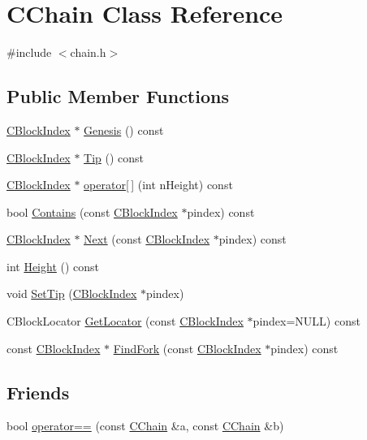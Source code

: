 \hypertarget{class_c_chain}{}\section{C\+Chain Class Reference}
\label{class_c_chain}


{\ttfamily \#include $<$chain.\+h$>$}

\subsection*{Public Member Functions}
\begin{DoxyCompactItemize}
\item 
\hyperlink{class_c_block_index}{C\+Block\+Index} $\ast$ \hyperlink{class_c_chain_a1eee0372da596a8fc68369e480adc2f1}{Genesis} () const 
\item 
\hyperlink{class_c_block_index}{C\+Block\+Index} $\ast$ \hyperlink{class_c_chain_a7482d06d8e8143f46326cf9c12c06daf}{Tip} () const 
\item 
\hyperlink{class_c_block_index}{C\+Block\+Index} $\ast$ \hyperlink{class_c_chain_affb24f7752a2b7e7df25db12b2a40e94}{operator\mbox{[}$\,$\mbox{]}} (int n\+Height) const 
\item 
bool \hyperlink{class_c_chain_a1ab1fe2932227af222699c64847e838b}{Contains} (const \hyperlink{class_c_block_index}{C\+Block\+Index} $\ast$pindex) const 
\item 
\hyperlink{class_c_block_index}{C\+Block\+Index} $\ast$ \hyperlink{class_c_chain_acd3c27582e3d60b93363fda5d9f3775a}{Next} (const \hyperlink{class_c_block_index}{C\+Block\+Index} $\ast$pindex) const 
\item 
int \hyperlink{class_c_chain_a0c4ffb8501acfb8a7e1c0f5e6322ada3}{Height} () const 
\item 
void \hyperlink{class_c_chain_aeb563751f7362d4308c7c2cb35b834a5}{Set\+Tip} (\hyperlink{class_c_block_index}{C\+Block\+Index} $\ast$pindex)
\item 
C\+Block\+Locator \hyperlink{class_c_chain_a3f7e9ed312ad1cadd266a9529586ade6}{Get\+Locator} (const \hyperlink{class_c_block_index}{C\+Block\+Index} $\ast$pindex=N\+U\+L\+L) const 
\item 
const \hyperlink{class_c_block_index}{C\+Block\+Index} $\ast$ \hyperlink{class_c_chain_af78b090452717b2c45ba1a58bbde3e78}{Find\+Fork} (const \hyperlink{class_c_block_index}{C\+Block\+Index} $\ast$pindex) const 
\end{DoxyCompactItemize}
\subsection*{Friends}
\begin{DoxyCompactItemize}
\item 
bool \hyperlink{class_c_chain_a0e46ed4192afeafb8d420b2d6d9bb24c}{operator==} (const \hyperlink{class_c_chain}{C\+Chain} \&a, const \hyperlink{class_c_chain}{C\+Chain} \&b)
\end{DoxyCompactItemize}


